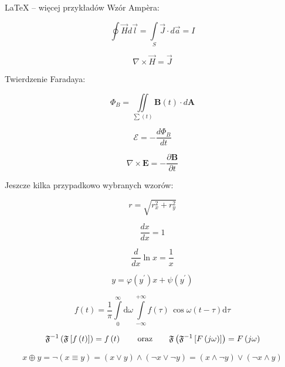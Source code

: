 \begin{easyappendix}{\LaTeX{} -- więcej przykładów}
Wzór Ampèra:

\begin{equation}
	\oint \vec{H} d\vec{l} = \int\limits_{S} \vec{J} \cdot d \vec{a} = I
\end{equation}

\begin{equation}
	\nabla \times \vec{H} = \vec{J}
\end{equation}


Twierdzenie Faradaya:

\begin{equation*}
	\Phi_B = \iint\limits_{\sum (t)} \pmb{B}(t) \cdot d\pmb{A}
\end{equation*}

\begin{equation}
	\mathcal{E} = -\frac{d\Phi_B}{dt}
\end{equation}

\begin{equation}
	\nabla \times \pmb{E} = - \frac{\partial \pmb{B}}{\partial t}
\end{equation}

Jeszcze kilka przypadkowo wybranych wzorów:

\begin{equation*}
	r = \sqrt{r_x^2 + r_y^2}
\end{equation*}

\begin{equation}
	\frac{dx}{dx} = 1
\end{equation}

\begin{equation}
	\frac{d}{dx} \ln x = \frac{1}{x}
\end{equation}

\begin{equation}
	y = \varphi  (y^\prime)x + \psi(y^\prime)
\end{equation}

\begin{equation}
	f(t) = \frac{1}{\pi} \int\limits_0^\infty \mathrm{d} \omega \,\int\limits_{-\infty}^{+\infty} f(\tau)\, \cos \omega (t-\tau)  \mathrm{d}\tau
\end{equation}

\[
\mathfrak{F}^{-1}\left(\mathfrak{F} \left[ f\left(t \right ) \right ] \right ) = f \left(t \right )
\qquad \textup{oraz} \qquad
\mathfrak{F}\left(\mathfrak{F}^{-1} \left[ F\left(j\omega \right ) \right ] \right ) = F \left(j\omega \right )
\]

\begin{equation*}
	x \oplus y = \neg (x \equiv y) = (x \vee y) \wedge (\neg x \vee \neg y) = (x \wedge \neg y) \vee (\neg x \wedge y)
\end{equation*}


\end{easyappendix}
